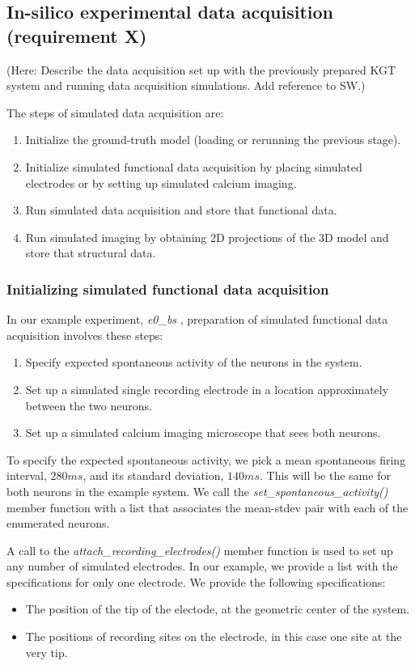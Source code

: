 \documentclass{ldr-article}
\def\firstexp{\textit{e0\_bs} }
\begin{document}
\subsection{In-silico experimental data acquisition (requirement X)}

(Here: Describe the data acquisition set up with the previously prepared KGT system and running data acquisition simulations. Add reference to SW.)

The steps of simulated data acquisition are:
\begin{enumerate}
	\item Initialize the ground-truth model (loading or rerunning the previous stage).
	\item Initialize simulated functional data acquisition by placing simulated electrodes or by setting up simulated calcium imaging.
	\item Run simulated data acquisition and store that functional data.
	\item Run simulated imaging by obtaining 2D projections of the 3D model and store that structural data.
\end{enumerate}

\subsubsection{Initializing simulated functional data acquisition}

In our example experiment, \firstexp, preparation of simulated functional data acquisition involves these steps:
\begin{enumerate}
	\item Specify expected spontaneous activity of the neurons in the system.
	\item Set up a simulated single recording electrode in a location approximately between the two neurons.
	\item Set up a simulated calcium imaging microscope that sees both neurons.
\end{enumerate}

To specify the expected spontaneous activity, we pick a mean spontaneous firing interval, $280 ms$, and its standard deviation, $140 ms$. This will be the same for both neurons in the example system. We call the \textit{set\_spontaneous\_activity()} member function with a list that associates the mean-stdev pair with each of the enumerated neurons.

A call to the \textit{attach\_recording\_electrodes()} member function is used to set up any number of simulated electrodes. In our example, we provide a list with the specifications for only one electrode. We provide the following specifications:
\begin{itemize}
	\item The position of the tip of the electode, at the geometric center of the system.
	\item The positions of recording sites on the electrode, in this case one site at the very tip.
\end{itemize}
\end{document}
